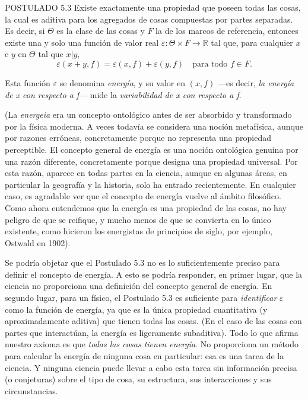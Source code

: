 \begin{justifying}
    \noindent POSTULADO 5.3 Existe exactamente una propiedad que poseen todas las cosas, la cual es aditiva para los agregados de cosas compuestas por partes separadas. Es decir, 
    si $\Theta$ es la clase de las cosas y $F$ la de los marcos de referencia, entonces existe una y solo una función de valor real $\varepsilon: \Theta \times F \to \mathbb{R}$ 
    tal que, para cualquier $x$ e $y$ en $\Theta$ tal que $x|y$,
    \[
        \varepsilon(x+y,f) = \varepsilon(x,f) + \varepsilon(y,f) \quad \text{para todo } f \in F.
    \]

    \noindent Esta función $\varepsilon$ se denomina \textit{energía}, y su valor en $(x, f)$ —es decir, \textit{la energía de x con respecto a f}— mide la \textit{variabilidad de x con respecto a f}.

    (La \textit{energeia} era un concepto ontológico antes de ser absorbido y transformado por la física moderna. A veces todavía se considera una noción metafísica, aunque por razones erróneas, concretamente 
    porque no representa una propiedad perceptible. El concepto general de energía es una noción ontológica genuina por una razón diferente, concretamente porque designa una propiedad universal. Por esta razón, 
    aparece en todas partes en la ciencia, aunque en algunas áreas, en particular la geografía y la historia, solo ha entrado recientemente. En cualquier caso, es agradable ver que el concepto de energía vuelve 
    al ámbito filosófico. Como ahora entendemos que la energía es una propiedad de las cosas, no hay peligro de que se reifique, y mucho menos de que se convierta en lo único existente, como hicieron los energistas 
    de principios de siglo, por ejemplo, Ostwald en 1902).

    Se podría objetar que el Postulado 5.3 no es lo suficientemente preciso para definir el concepto de energía. A esto se podría responder, en primer lugar, que la ciencia no proporciona una definición del concepto 
    general de energía. En segundo lugar, para un físico, el Postulado 5.3 es suficiente para \textit{identificar} $\varepsilon$ como la función de energía, ya que es la única propiedad cuantitativa (y aproximadamente aditiva) que tienen 
    todas las cosas. (En el caso de las cosas con partes que interactúan, la energía es ligeramente subaditiva). Todo lo que afirma nuestro axioma es que \textit{todas las cosas tienen energía}. No proporciona un método para 
    calcular la energía de ninguna cosa en particular: esa es una tarea de la ciencia. Y ninguna ciencia puede llevar a cabo esta tarea sin información precisa (o conjeturas) sobre el tipo de cosa, su estructura, sus 
    interacciones y sus circunstancias.


\end{justifying}
